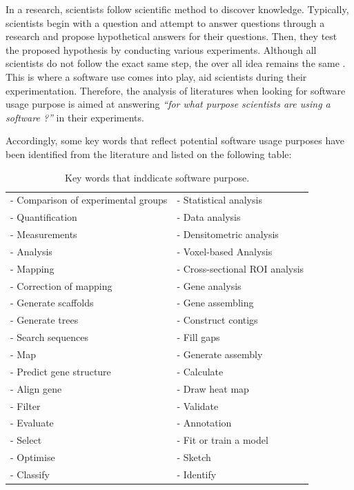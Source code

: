 In a research, scientists follow scientific method to discover knowledge. Typically, scientists begin with a question and attempt to answer questions through a research and propose hypothetical answers for their questions. Then, they test the proposed hypothesis by conducting various experiments. Although all scientists do not follow the exact same step, the over all idea remains the same \citep{enwiki:1061107378}. This is where a software use comes into play, aid scientists during their experimentation. Therefore, the analysis of literatures when looking for software usage purpose is aimed at answering \emph{“for what purpose scientists are using a software ?”} in their experiments. 

Accordingly, some key words that reflect potential software usage purposes have been identified from the literature and listed on the following table:


\begin{table}[h!]
	\begin{center}
		\caption{Key words that inddicate software purpose.}
		\label{tab:table1}
		\begin{tabular}{|l|l|} %
			
			\hline
			- Comparison of experimental groups & -	Statistical analysis  \\
			- Quantification & - Data analysis \\
			- Measurements   & - Densitometric analysis \\
			- Analysis       & - Voxel-based Analysis  \\
			- Mapping        & - Cross-sectional ROI analysis \\
			- Correction of mapping  & - Gene analysis     \\
			- Generate scaffolds     & - Gene assembling \\
			- Generate trees         & - Construct contigs \\
			- Search sequences       & - Fill gaps \\
			- Map                    & - Generate assembly \\
			- Predict gene structure & - Calculate \\
			- Align gene             & - Draw heat map \\
			- Filter                 & - Validate \\
			- Evaluate               & - Annotation \\
			- Select                 & - Fit or train a model \\ 
			- Optimise               & - Sketch \\
			- Classify               & - Identify \\
			
			\hline
		\end{tabular}
	\end{center}
\end{table}

